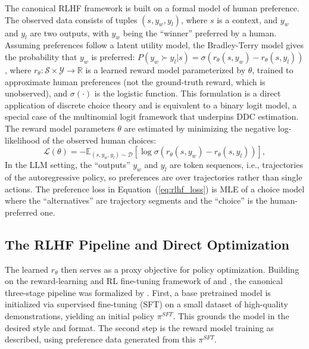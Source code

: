 The canonical RLHF framework is built on a formal model of human preference. The observed data consists of tuples $(s, y_w, y_l)$, where $s$ is a context, and $y_w$ and $y_l$ are two outputs, with $y_w$ being the ``winner'' preferred by a human. Assuming preferences follow a latent utility model, the Bradley-Terry model \citep{bradley1952rank} gives the probability that $y_w$ is preferred: $P(y_w \succ y_l | s) = \sigma(r_\theta(s, y_w) - r_\theta(s, y_l))$, where $r_\theta: \mathcal{S} \times \mathcal{Y} \to \mathbb{R}$ is a learned reward model parameterized by $\theta$, trained to approximate human preferences (not the ground-truth reward, which is unobserved), and $\sigma(\cdot)$ is the logistic function. This formulation is a direct application of discrete choice theory and is equivalent to a binary logit model, a special case of the multinomial logit framework \citep{mcfadden:1973} that underpins DDC estimation. The reward model parameters $\theta$ are estimated by minimizing the negative log-likelihood of the observed human choices:
\begin{equation}
    \mathcal{L}(\theta) = -\mathbb{E}_{(s, y_w, y_l) \sim \mathcal{D}} \left[ \log \sigma \left( r_\theta(s, y_w) - r_\theta(s, y_l) \right) \right],
\label{eq:rlhf_loss}
\end{equation}
In the LLM setting, the ``outputs'' $y_w$ and $y_l$ are token sequences, i.e., trajectories of the autoregressive policy, so preferences are over trajectories rather than single actions. The preference loss in Equation~(\ref{eq:rlhf_loss}) is MLE of a choice model where the ``alternatives'' are trajectory segments and the ``choice'' is the human-preferred one.

\subsection{The RLHF Pipeline and Direct Optimization}

The learned $r_\theta$ then serves as a proxy objective for policy optimization. Building on the reward-learning and RL fine-tuning framework of \citet{ziegler2019fine} and \citet{stiennon2020learning}, the canonical three-stage pipeline was formalized by \citet{ouyang2022training}. First, a base pretrained model is initialized via supervised fine-tuning (SFT) on a small dataset of high-quality demonstrations, yielding an initial policy $\pi^{SFT}$. This grounds the model in the desired style and format. The second step is the reward model training as described, using preference data generated from this $\pi^{SFT}$.

